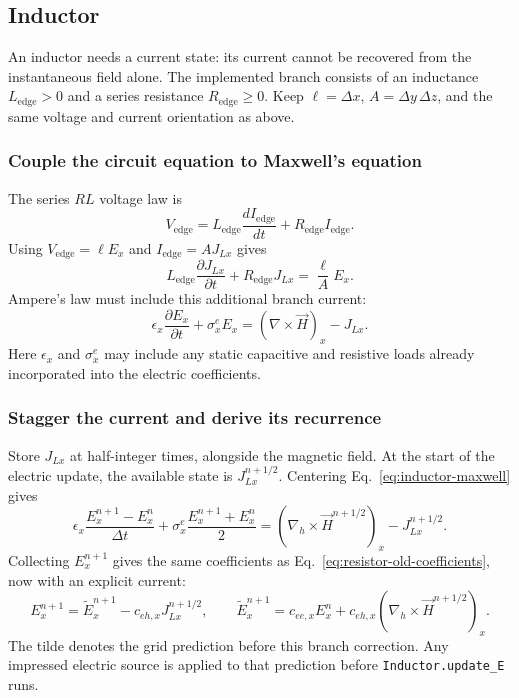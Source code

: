 \documentclass[10pt]{article}
\begin{document}
\subsection{Inductor}
\label{sec:inductor}
An inductor needs a current state: its current cannot be recovered from
the instantaneous field alone. The implemented branch consists of an
inductance $L_{\mathrm{edge}}>0$ and a series resistance
$R_{\mathrm{edge}}\geq0$. Keep $\ell=\Delta x$, $A=\Delta y\,\Delta z$,
and the same voltage and current orientation as above.

\subsubsection{Couple the circuit equation to Maxwell's equation}
The series $RL$ voltage law is
\begin{equation}
    V_{\mathrm{edge}}=L_{\mathrm{edge}}\frac{dI_{\mathrm{edge}}}{dt}
                         +R_{\mathrm{edge}}I_{\mathrm{edge}}.
\end{equation}
Using $V_{\mathrm{edge}}=\ell E_x$ and $I_{\mathrm{edge}}=A J_{Lx}$ gives
\begin{equation}
    \boxed{L_{\mathrm{edge}}\frac{\partial J_{Lx}}{\partial t}
                +R_{\mathrm{edge}}J_{Lx}=\frac{\ell}{A}E_x.}
    \label{eq:inductor-current}
\end{equation}
Ampere's law must include this additional branch current:
\begin{equation}
    \epsilon_x\frac{\partial E_x}{\partial t}+\sigma_x^e E_x
        =(\nabla\times\vec H)_x-J_{Lx}.
    \label{eq:inductor-maxwell}
\end{equation}
Here $\epsilon_x$ and $\sigma_x^e$ may include any static capacitive and
resistive loads already incorporated into the electric coefficients.

\subsubsection{Stagger the current and derive its recurrence}
Store $J_{Lx}$ at half-integer times, alongside the magnetic field.
At the start of the electric update, the available state is
$J_{Lx}^{n+1/2}$. Centering Eq.~\eqref{eq:inductor-maxwell} gives
\begin{equation}
    \epsilon_x\frac{E_x^{n+1}-E_x^n}{\Delta t}
       +\sigma_x^e\frac{E_x^{n+1}+E_x^n}{2}
       =(\nabla_h\times\vec H^{n+1/2})_x-J_{Lx}^{n+1/2}.
\end{equation}
Collecting $E_x^{n+1}$ gives the same coefficients as
Eq.~\eqref{eq:resistor-old-coefficients}, now with an explicit current:
\begin{equation}
    \boxed{E_x^{n+1}=\widetilde E_x^{n+1}-c_{eh,x}J_{Lx}^{n+1/2},\qquad
    \widetilde E_x^{n+1}=c_{ee,x}E_x^n
                     +c_{eh,x}(\nabla_h\times\vec H^{n+1/2})_x.}
    \label{eq:inductor-field}
\end{equation}
The tilde denotes the grid prediction before this branch correction.
Any impressed electric source is applied to that prediction before
\texttt{Inductor.update\_E} runs.
\end{document}
